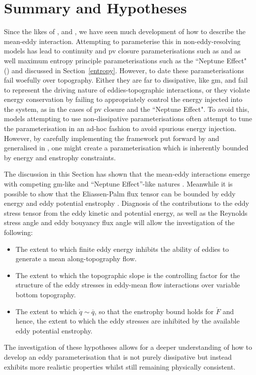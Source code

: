 \documentclass[12pt,a4paper]{report}
\newcommand*\thkmean[1]{\overline{#1}}
\newcommand*\spec[1]{\mathring{#1}}
\begin{document}
                       
                     


\section{Summary and Hypotheses}
\label{hypotheses}

Since the likes of \cite{young1982shear}, \cite{holloway1987systematic} and
\cite{gent1990}, we have seen much development of how to describe the mean-eddy interaction.
Attempting to parameterise this in non-eddy-resolving models has lead to 
continuity and \gls{pv} closure parameterisations such as \cite{gent1990}
and \cite{greatbatch1998exploring} as well maximum entropy principle parameterisations 
such as the ``Neptune Effect" (\cite{holloway1992representing}) and \cite{polyakov2001eddy} discussed in Section~\ref{entropy}.
However, to date these parameterisations fail woefully over topography. Either
they are far to dissipative, like \gls{gm}, and fail to represent the driving nature
of eddies-topographic interactions, or they violate energy conservation
by failing to appropriately control the energy injected into the system, as in the cases
of \gls{pv} closure and the ``Neptune Effect". To avoid this, models attempting to
use non-dissipative parameterisations often attempt to tune the parameterisation in
an ad-hoc fashion to avoid spurious energy injection. However, by carefully implementing
the framework put forward by \cite{marshall2012framework} and generalised in
\cite{maddison2013eliassen}, one might create a parameterisation which is
inherently bounded by energy and enstrophy constraints.

The discussion in this Section has shown that the mean-eddy interactions 
emerge with competing \gls{gm}-like and ``Neptune Effect''-like natures
\cite{adcock2000interactions}. Meanwhile  it is possible to show that
the Eliassen-Palm flux tensor can be bounded by eddy energy and eddy potential enstrophy
\cite{marshall2012framework}.
Diagnosis of the contributions to the eddy stress tensor from
the eddy kinetic and potential energy, as well as the Reynolds stress angle and eddy bouyancy flux angle will allow the investigation of the following:
\begin{itemize} 
	\item The extent to which finite eddy energy inhibits the ability of eddies to
	generate a mean along-topography flow.
		\item The extent to which the topographic slope is the controlling factor for the structure of the eddy stresses in eddy-mean flow interactions over variable bottom topography.
	    \item The extent to which $\spec{q} \sim \thkmean{q}$, so that the enstrophy bound holds for $\spec{F}$ and hence, the extent to which the eddy stresses are inhibited by the available eddy potential enstrophy.
\end{itemize} 
The investigation of these hypotheses allows for a deeper understanding of
how to develop an eddy parameterisation that is not purely dissipative but instead exhibits
more realistic properties whilst still remaining physically consistent. 
 
\end{document}
